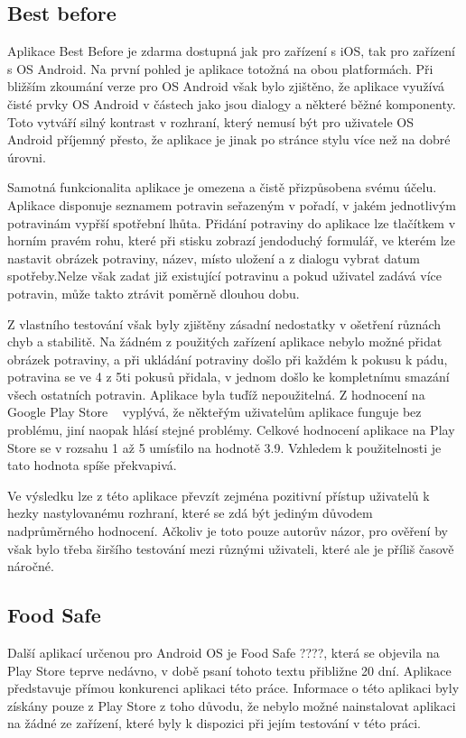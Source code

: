 \documentclass[thesis=B,czech]{FITthesis}[2013/10/20]
\begin{document}
\subsection{Best before}

Aplikace Best Before je zdarma dostupná jak pro zařízení s iOS, tak pro zařízení s OS Android. Na první pohled je aplikace totožná na obou platformách. Při bližším zkoumání verze pro OS Android však bylo zjištěno, že aplikace využívá čisté prvky OS Android v částech jako jsou dialogy a některé běžné komponenty. Toto vytváří silný kontrast v rozhraní, který nemusí být pro uživatele OS Android příjemný přesto, že aplikace je jinak po stránce stylu více než na dobré úrovni.

Samotná funkcionalita aplikace je omezena a čistě přizpůsobena svému účelu. Aplikace disponuje seznamem potravin seřazeným v pořadí, v jakém jednotlivým potravinám vypřší spotřební lhůta. Přidání potraviny do aplikace lze tlačítkem v horním pravém rohu, které při stisku zobrazí jendoduchý formulář, ve kterém lze nastavit obrázek potraviny, název, místo uložení a z dialogu vybrat datum spotřeby.Nelze však zadat již existující potravinu a pokud uživatel zadává více potravin, může takto ztrávit poměrně dlouhou dobu.

Z vlastního testování však byly zjištěny zásadní nedostatky v ošetření různách chyb a stabilitě. Na žádném z použitých zařízení aplikace nebylo možné přidat obrázek potraviny, a při ukládání potraviny došlo při každém k pokusu k pádu, potravina se ve 4 z 5ti pokusů přidala, v jednom došlo ke kompletnímu smazání všech ostatních potravin. Aplikace byla tuďíž nepoužitelná. Z hodnocení na Google Play Store ~\cite{play_store} vyplývá, že někteřým uživatelům aplikace funguje bez problému, jiní naopak hlásí stejné problémy. Celkové hodnocení aplikace na Play Store se v rozsahu 1 až 5 umísťilo na hodnotě 3.9. Vzhledem k použitelnosti je tato hodnota spíše překvapivá.

Ve výsledku lze z této aplikace převzít zejména pozitivní přístup uživatelů k hezky nastylovanému rozhraní, které se zdá být jediným důvodem nadprůměrného hodnocení. Ačkoliv je toto pouze autorův názor, pro ověření by však bylo třeba širšího testování mezi různými uživateli, které ale je příliš časově náročné.

\subsection{Food Safe}

Další aplikací určenou pro Android OS je Food Safe ????, která se objevila na Play Store teprve nedávno, v době psaní tohoto textu přibližne 20 dní. Aplikace představuje přímou konkurenci aplikaci této práce. Informace o této aplikaci byly získány pouze z Play Store z toho důvodu, že nebylo možné nainstalovat aplikaci na žádné ze zařízení, které byly k dispozici při jejím testování v této práci. 
\end{document}

